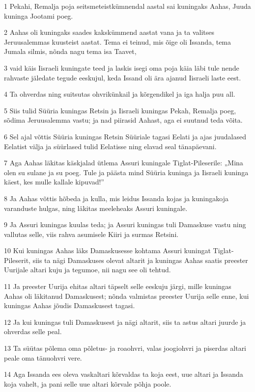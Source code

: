 \par 1 Pekahi, Remalja poja seitsmeteistkümnendal aastal sai kuningaks Aahas, Juuda kuninga Jootami poeg.
\par 2 Aahas oli kuningaks saades kakskümmend aastat vana ja ta valitses Jeruusalemmas kuusteist aastat. Tema ei teinud, mis õige oli Issanda, tema Jumala silmis, nõnda nagu tema isa Taavet,
\par 3 vaid käis Iisraeli kuningate teed ja laskis isegi oma poja käia läbi tule nende rahvaste jäledate tegude eeskujul, keda Issand oli ära ajanud Iisraeli laste eest.
\par 4 Ta ohverdas ning suitsutas ohvrikünkail ja kõrgendikel ja iga halja puu all.
\par 5 Siis tulid Süüria kuningas Retsin ja Iisraeli kuningas Pekah, Remalja poeg, sõdima Jeruusalemma vastu; ja nad piirasid Aahast, aga ei suutnud teda võita.
\par 6 Sel ajal võttis Süüria kuningas Retsin Süüriale tagasi Eelati ja ajas juudalased Eelatist välja ja süürlased tulid Eelatisse ning elavad seal tänapäevani.
\par 7 Aga Aahas läkitas käskjalad ütlema Assuri kuningale Tiglat-Pileserile: „Mina olen su sulane ja su poeg. Tule ja päästa mind Süüria kuninga ja Iisraeli kuninga käest, kes mulle kallale kipuvad!”
\par 8 Ja Aahas võttis hõbeda ja kulla, mis leidus Issanda kojas ja kuningakoja varanduste hulgas, ning läkitas meeleheaks Assuri kuningale.
\par 9 Ja Assuri kuningas kuulas teda; ja Assuri kuningas tuli Damaskuse vastu ning vallutas selle, viis rahva asumisele Kiiri ja surmas Retsini.
\par 10 Kui kuningas Aahas läks Damaskusesse kohtama Assuri kuningat Tiglat-Pileserit, siis ta nägi Damaskuses olevat altarit ja kuningas Aahas saatis preester Uurijale altari kuju ja tegumoe, nii nagu see oli tehtud.
\par 11 Ja preester Uurija ehitas altari täpselt selle eeskuju järgi, mille kuningas Aahas oli läkitanud Damaskusest; nõnda valmistas preester Uurija selle enne, kui kuningas Aahas jõudis Damaskusest tagasi.
\par 12 Ja kui kuningas tuli Damaskusest ja nägi altarit, siis ta astus altari juurde ja ohverdas selle peal.
\par 13 Ta süütas põlema oma põletus- ja roaohvri, valas joogiohvri ja piserdas altari peale oma tänuohvri vere.
\par 14 Aga Issanda ees oleva vaskaltari kõrvaldas ta koja eest, uue altari ja Issanda koja vahelt, ja pani selle uue altari kõrvale põhja poole.

